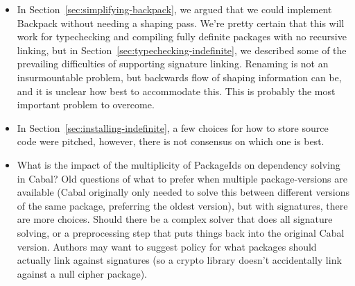 \documentclass{article}
\begin{document}
\begin{itemize}

    \item In Section~\ref{sec:simplifying-backpack}, we argued that we
        could implement Backpack without needing a shaping pass. We're
        pretty certain that this will work for typechecking and
        compiling fully definite packages with no recursive linking, but
        in Section~\ref{sec:typechecking-indefinite}, we described some
        of the prevailing difficulties of supporting signature linking.
        Renaming is not an insurmountable problem, but backwards flow of
        shaping information can be, and it is unclear how best to
        accommodate this.  This is probably the most important problem
        to overcome.

    \item In Section~\ref{sec:installing-indefinite}, a few choices for how to
        store source code were pitched, however, there is not consensus on which
        one is best.

    \item What is the impact of the multiplicity of PackageIds on
        dependency solving in Cabal?  Old questions of what to prefer
        when multiple package-versions are available (Cabal originally
        only needed to solve this between different versions of the same
        package, preferring the oldest version), but with signatures,
        there are more choices.  Should there be a complex solver that
        does all signature solving, or a preprocessing step that puts
        things back into the original Cabal version.  Authors may want
        to suggest policy for what packages should actually link against
        signatures (so a crypto library doesn't accidentally link
        against a null cipher package).

\end{itemize}



\end{document}
